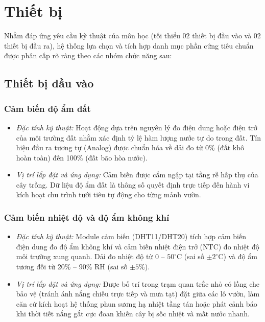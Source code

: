 \section{Thiết bị}

Nhằm đáp ứng yêu cầu kỹ thuật của môn học (tối thiểu 02 thiết bị đầu vào và 02 thiết bị đầu ra), hệ thống lựa chọn và tích hợp danh mục phần cứng tiêu chuẩn được phân cấp rõ ràng theo các nhóm chức năng sau:

\subsection{Thiết bị đầu vào}

\subsubsection{Cảm biến độ ẩm đất}
\begin{itemize}
    \item \textit{Đặc tính kỹ thuật:} Hoạt động dựa trên nguyên lý đo điện dung hoặc điện trở của môi trường đất nhằm xác định tỷ lệ hàm lượng nước tự do trong đất. Tín hiệu đầu ra tương tự (Analog) được chuẩn hóa về dải đo từ 0\% (đất khô hoàn toàn) đến 100\% (đất bão hòa nước).
    \item \textit{Vị trí lắp đặt và ứng dụng:} Cảm biến được cắm ngập tại tầng rễ hấp thụ của cây trồng. Dữ liệu độ ẩm đất là thông số quyết định trực tiếp đến hành vi kích hoạt chu trình tưới tiêu tự động cho từng mảnh vườn.
\end{itemize}

\subsubsection{Cảm biến nhiệt độ và độ ẩm không khí}
\begin{itemize}
    \item \textit{Đặc tính kỹ thuật:} Module cảm biến (DHT11/DHT20) tích hợp cảm biến điện dung đo độ ẩm không khí và cảm biến nhiệt điện trở (NTC) đo nhiệt độ môi trường xung quanh. Dải đo nhiệt độ từ 0 -- $50^\circ\text{C}$ (sai số $\pm 2^\circ\text{C}$) và độ ẩm tương đối từ 20\% -- 90\% RH (sai số $\pm 5\%$).
    \item \textit{Vị trí lắp đặt và ứng dụng:} Được bố trí trong trạm quan trắc nhỏ có lồng che bảo vệ (tránh ánh nắng chiếu trực tiếp và mưa tạt) đặt giữa các lô vườn, làm căn cứ kích hoạt hệ thống phun sương hạ nhiệt tầng tán hoặc phát cảnh báo khi thời tiết nắng gắt cực đoan khiến cây bị sốc nhiệt và mất nước nhanh.
\end{itemize}

